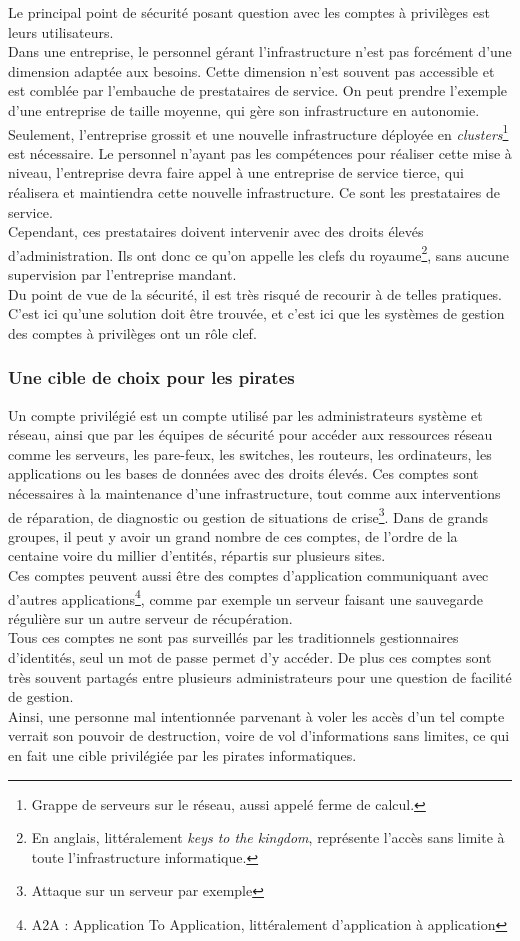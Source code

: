 Le principal point de sécurité posant question avec les comptes à privilèges est leurs utilisateurs.\\
Dans une entreprise, le personnel gérant l'infrastructure n'est pas forcément d'une dimension adaptée aux besoins. Cette dimension n'est souvent pas accessible et est comblée par l'embauche de prestataires de service. On peut prendre l'exemple d'une entreprise de taille moyenne, qui gère son infrastructure en autonomie. Seulement, l'entreprise grossit et une nouvelle infrastructure déployée en \emph{clusters}\footnote{Grappe de serveurs sur le réseau, aussi appelé ferme de calcul.} est nécessaire. Le personnel n'ayant pas les compétences pour réaliser cette mise à niveau, l'entreprise devra faire appel à une entreprise de service tierce, qui réalisera et maintiendra cette nouvelle infrastructure. Ce sont les prestataires de service.\\
Cependant, ces prestataires doivent intervenir avec des droits élevés d'administration. Ils ont donc ce qu'on appelle les clefs du royaume\footnote{En anglais, littéralement \emph{keys to the kingdom}, représente l'accès sans limite à toute l'infrastructure informatique.}, sans aucune supervision par l'entreprise mandant.\\
Du point de vue de la sécurité, il est très risqué de recourir à de telles pratiques. C'est ici qu'une solution doit être trouvée, et c'est ici que les systèmes de gestion des comptes à privilèges ont un rôle clef.

\subsubsection{Une cible de choix pour les pirates}
Un compte privilégié est un compte utilisé par les administrateurs système et réseau, ainsi que par les équipes de sécurité pour accéder aux ressources réseau comme les serveurs, les pare-feux, les switches, les routeurs, les ordinateurs, les applications ou les bases de données avec des droits élevés. Ces comptes sont nécessaires à la maintenance d'une infrastructure, tout comme aux interventions de réparation, de diagnostic ou gestion de situations de crise\footnote{Attaque sur un serveur par exemple}. Dans de grands groupes, il peut y avoir un grand nombre de ces comptes, de l'ordre de la centaine voire du millier d'entités, répartis sur plusieurs sites.\\
Ces comptes peuvent aussi être des comptes d'application communiquant avec d'autres applications\footnote{A2A : Application To Application, littéralement d'application à application}, comme par exemple un serveur faisant une sauvegarde régulière sur un autre serveur de récupération.\\
Tous ces comptes ne sont pas surveillés par les traditionnels gestionnaires d'identités, seul un mot de passe permet d'y accéder. De plus ces comptes sont très souvent partagés entre plusieurs administrateurs pour une question de facilité de gestion.\\
Ainsi, une personne mal intentionnée parvenant à voler les accès d'un tel compte verrait son pouvoir de destruction, voire de vol d'informations sans limites, ce qui en fait une cible privilégiée par les pirates informatiques.

